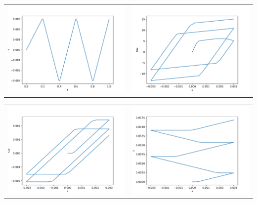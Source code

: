 \documentclass{article}
\newcounter{bmcsexample}
\begin{document}
\begin{bmcsexample}
\noindent
\begin{tabular}{L{7.5cm}L{7.5cm}}
\includegraphics[width=7.5cm]{fig140675832832464.pdf}
 & 
\includegraphics[width=7.5cm]{fig140675827491088.pdf}
 \\\end{tabular}

\noindent
\begin{tabular}{L{7.5cm}L{7.5cm}}
\includegraphics[width=7.5cm]{fig140675827491664.pdf}
 & 
\includegraphics[width=7.5cm]{fig140675827492144.pdf}
 \\\end{tabular}


\end{bmcsexample}
\end{document}
